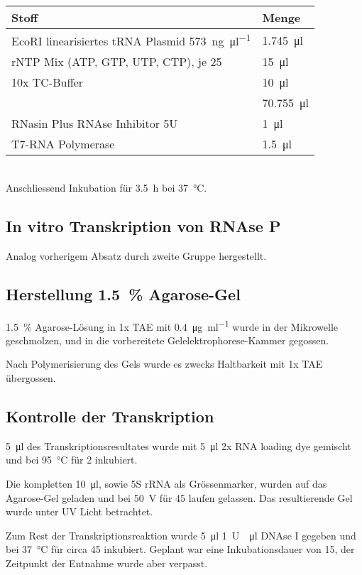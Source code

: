 \documentclass[a4paper,english]{scrreprt}
\begin{document}
\begin{tabu}{ll}
	\toprule
	Stoff & Menge \\
	\midrule
	EcoRI linearisiertes tRNA Plasmid \SI{573}{\ng \per \ul} & \SI{1.745}{\ul} \\
	rNTP Mix (ATP, GTP, UTP, CTP), je \SI{25}{\milli\Molar} & \SI{15}{\ul} \\
	10x TC-Buffer & \SI{10}{\ul} \\
	 & \SI{70.755}{\ul} \\
	RNasin Plus RNAse Inhibitor 5U & \SI{1}{\ul} \\
	T7-RNA Polymerase & \SI{1.5}{\ul} \\
	\bottomrule
\end{tabu}
\\

Anschliessend Inkubation für \SI{3.5}{\hour} bei \SI{37}{\celsius}.

\subsection{In vitro Transkription von RNAse P}

Analog vorherigem Absatz durch zweite Gruppe hergestellt.

\subsection{Herstellung \SI{1.5}{\percent} Agarose-Gel}

\SI{1.5}{\percent} Agarose-Lösung in 1x TAE mit \SI{0.4}{\ug \per \ml}
 wurde in der Mikrowelle geschmolzen, und in die vorbereitete
Gelelektrophorese-Kammer gegossen.

Nach Polymerisierung des Gels wurde es zwecks Haltbarkeit mit 1x TAE
übergossen.

\subsection{Kontrolle der Transkription}

\SI{5}{\ul} des Transkriptionsresultates wurde mit \SI{5}{\ul} 2x RNA loading
dye gemischt und bei \SI{95}{\celsius} für \SI{2}{\min} inkubiert.

Die kompletten \SI{10}{\ul}, sowie 5S rRNA als Grössenmarker, wurden auf das
Agarose-Gel geladen und bei \SI{50}{\volt} für \SI{45}{\min} laufen gelassen.
Das resultierende Gel wurde unter UV Licht betrachtet.

Zum Rest der Transkriptionsreaktion wurde \SI{5}{\ul} \SI{1}{U \per \ul} DNAse
I gegeben und bei \SI{37}{\celsius} für circa \SI{45}{\min} inkubiert. Geplant
war eine Inkubationsdauer von \SI{15}{\min}, der Zeitpunkt der Entnahme wurde
aber verpasst.
\end{document}
